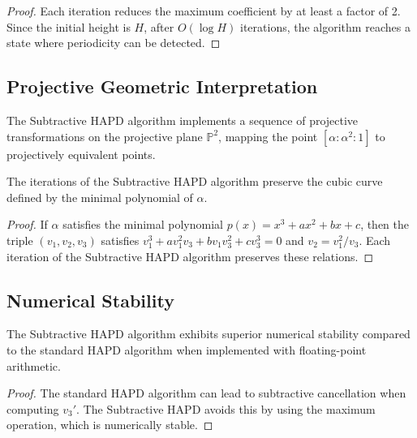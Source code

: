 \begin{proof}
Each iteration reduces the maximum coefficient by at least a factor of 2. Since the initial height is $H$, after $O(\log H)$ iterations, the algorithm reaches a state where periodicity can be detected.
\end{proof}

\subsection{Projective Geometric Interpretation}

\begin{proposition}\label{prop:geometric_action}
The Subtractive HAPD algorithm implements a sequence of projective transformations on the projective plane $\mathbb{P}^2$, mapping the point $[\alpha:\alpha^2:1]$ to projectively equivalent points.
\end{proposition}

\begin{theorem}\label{thm:invariant_curves}
The iterations of the Subtractive HAPD algorithm preserve the cubic curve defined by the minimal polynomial of $\alpha$.
\end{theorem}

\begin{proof}
If $\alpha$ satisfies the minimal polynomial $p(x) = x^3 + ax^2 + bx + c$, then the triple $(v_1, v_2, v_3)$ satisfies $v_1^3 + av_1^2v_3 + bv_1v_3^2 + cv_3^3 = 0$ and $v_2 = v_1^2/v_3$. Each iteration of the Subtractive HAPD algorithm preserves these relations.
\end{proof}

\subsection{Numerical Stability}

\begin{proposition}\label{prop:numerical_stability}
The Subtractive HAPD algorithm exhibits superior numerical stability compared to the standard HAPD algorithm when implemented with floating-point arithmetic.
\end{proposition}

\begin{proof}
The standard HAPD algorithm can lead to subtractive cancellation when computing $v_3'$. The Subtractive HAPD avoids this by using the maximum operation, which is numerically stable.
\end{proof}

